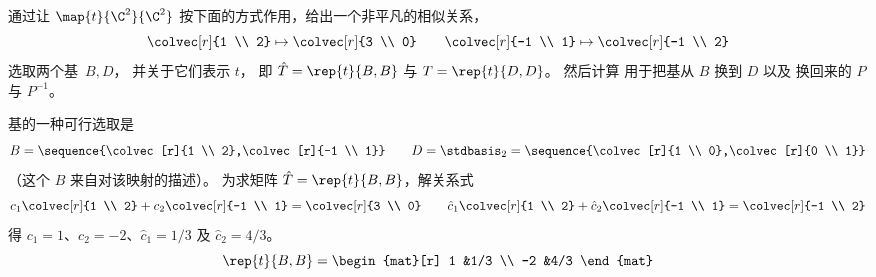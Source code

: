 \begin{exercises}
\begin{answer}
    \end{answer}
  \recommended \item
     通过让
     \( \map{t}{\C^2}{\C^2} \) 按下面的方式作用，给出一个非平凡的相似关系，
     \begin{equation*}
        \colvec[r]{1 \\ 2}\mapsto\colvec[r]{3 \\ 0}
        \qquad
        \colvec[r]{-1 \\ 1}\mapsto\colvec[r]{-1 \\ 2}
     \end{equation*}
     选取两个基~$B,D$，
     并关于它们表示 \( t \)，
     即 \( \hat{T}=\rep{t}{B,B} \) 与 \( T=\rep{t}{D,D} \)。
     然后计算 
     用于把基从 \( B \) 换到 \( D \) 以及 
     换回来的 \( P \) 与 \( P^{-1} \)。
     \begin{answer}
        基的一种可行选取是 
        \begin{equation*}
          B=\sequence{\colvec[r]{1 \\ 2},\colvec[r]{-1 \\ 1}}
          \qquad
          D=\stdbasis_2=\sequence{\colvec[r]{1 \\ 0},\colvec[r]{0 \\ 1}}
        \end{equation*}
        （这个 $B$ 来自对该映射的描述）。
        为求矩阵 $\hat{T}=\rep{t}{B,B}$，解关系式 
        \begin{equation*}
           c_1\colvec[r]{1 \\ 2}+c_2\colvec[r]{-1 \\ 1}=\colvec[r]{3 \\ 0}
           \qquad
          \hat{c}_1\colvec[r]{1 \\ 2}+\hat{c}_2\colvec[r]{-1 \\ 1}=\colvec[r]{-1 \\ 2}
        \end{equation*}
        得 \( c_1=1 \)、\( c_2=-2 \)、\( \hat{c}_1=1/3 \) 及
        \( \hat{c}_2=4/3 \)。
        \begin{equation*}
           \rep{t}{B,B}=
           \begin{mat}[r]
              1  &1/3 \\
             -2  &4/3
           \end{mat}
        \end{equation*}


\end{answer}
\end{exercises}
